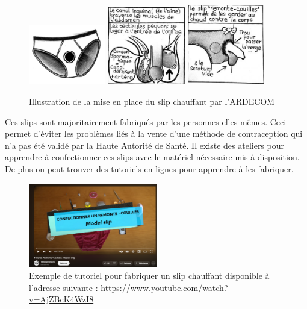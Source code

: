 \documentclass[12pt,a4paper]{report}
\begin{document}
\begin{figure}[h]
    \centering
    \includegraphics[width=0.3\textwidth]{images/scientiphique/slip_chauffant.png}
    \includegraphics[width=0.3\textwidth]{images/scientiphique/slip_chauffant_mise_en_place_1.png}
    \includegraphics[width=0.3\textwidth]{images/scientiphique/slip_chauffant_mise_en_place_2.png}
    \caption{Illustration de la mise en place du slip chauffant par l'ARDECOM \cite{MethodeThermique}}
    \label{fig:slip_chauffant}
\end{figure}

Ces slips sont majoritairement fabriqués par les personnes elles-mêmes. Ceci permet d'éviter les problèmes liés à la vente d'une méthode de contraception qui n'a pas été validé par la Haute Autorité de Santé. \cites{MethodeThermique}{guillaumedaudinContraceptesEnqueteDernier2022}
Il existe des ateliers pour apprendre à confectionner ces slips avec le matériel nécessaire mis à disposition. \cites{ContraceptionMasculineComment2023}{guillaumedaudinContraceptesEnqueteDernier2022}
De plus on peut trouver des tutoriels en lignes pour apprendre à les fabriquer.

\begin{figure}[H]
    \centering
    \includegraphics[width=0.5\textwidth]{images/scientiphique/Tuto_slip_contraceptif.png}
    \caption{Exemple de tutoriel pour fabriquer un slip chauffant disponible à l'adresse suivante : \href{https://www.youtube.com/watch?v=AjZBcK4WzI8}{https://www.youtube.com/watch?v=AjZBcK4WzI8}}
    \label{fig:tuto_slip_chauffant}
\end{figure}
\end{document}
